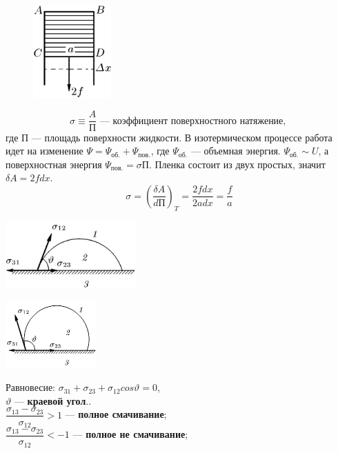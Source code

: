 \begin{figure}
	\includegraphics[width=30mm]{ris23_1.png}
\end{figure}
$$\sigma\equiv\dfrac{A}{\text{П}}\textbf{ --- коэффициент поверхностного натяжение, }$$
где $\text{П}\text{ --- площадь поверхности жидкости.}$ В изотермическом процессе работа идет на изменение $\Psi=\Psi_\text{об.}+\Psi_\text{пов.}$, где $\Psi_\text{об.}$ --- объемная энергия. $\Psi_\text{об.}\sim U$, а поверхностная энергия $\Psi_\text{пов.} =\sigma\text{П}$.
Пленка состоит из двух простых, значит $\delta A=2fdx$.
$$\sigma = \left(\dfrac{\delta A}{d\text{П}}\right)_T=\dfrac{2fdx}{2adx}=\dfrac{f}{a}$$
\begin{minipage}{55mm}
	\includegraphics[width=50mm]{ris23_2.png}\\[-1cm] 
\end{minipage}
\begin{minipage}{40mm}
	\includegraphics[width=35mm]{ris23_3.png} \\[-1cm] 
\end{minipage}
\begin{minipage}{80mm}
	Равновесие: $\sigma_{31}+\sigma_{23}+\sigma_{12}cos\vartheta=0$, \\$\vartheta$ --- \textbf{краевой угол}..\\
	$\dfrac{\sigma_{13}-\sigma_{23}}{\sigma_{12}}>1$ --- \textbf{полное смачивание};\\
	$\dfrac{\sigma_{13}-\sigma_{23}}{\sigma_{12}}<-1$ --- \textbf{полное не смачивание};
\end{minipage}
